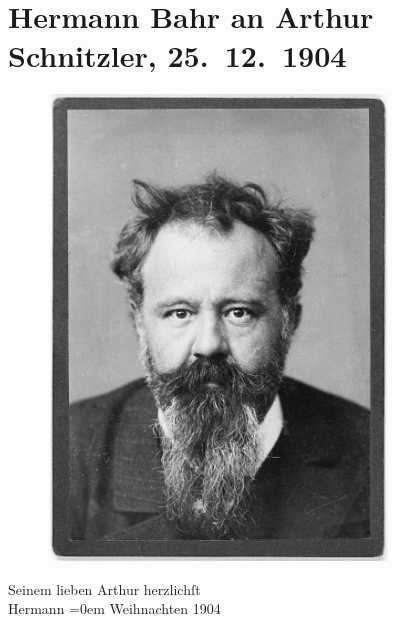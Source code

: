 

         
         \renewcommand{\erwaehntePersonen}{Personen: Hermann Bahr}
         \renewcommand{\erwaehnteOrte}{Orte: Wien}
         \renewcommand{\erwaehnteWerke}{}
               \section[Hermann Bahr an Arthur Schnitzler, 25. 12. 1904]{ Hermann Bahr an Arthur Schnitzler, 25. 12. 1904}\nopagebreak{}\rehead{ }\begin{ledgroupsized}[t]{13cm}\normalsize\beginnumbering{} \toendnotes[C]{\smallbreak\pagebreak[2]} 
\begin{figure}[H]\centering\includegraphics[width=9cm]{../tex-inputs/img/img6322-44r.jpg}\end{figure}\pstart
           \noindent{}{\pb}Seinem lieben Arthur\pend
           \pstart
           herzlichſt{\\[\baselineskip]}\spacefill\mbox{Hermann}\pend
           \leftskip=0em{}\pstart
           Weihnachten 1904\pend
           
         
         \endnumbering{}\end{ledgroupsized}  \newcommand{\dateiname}{L01483}\newcommand{\titel}{Hermann Bahr an Arthur Schnitzler, 25. 12. 1904}\newcommand{\editorInnen}{ Kurt Ifkovits,  Martin Anton Müller}
      